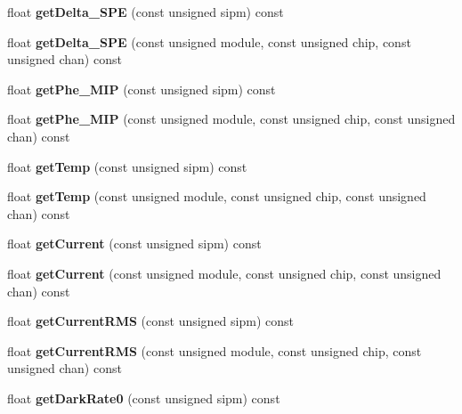 \begin{DoxyCompactItemize}
\item 
float {\bfseries get\-Delta\-\_\-\-S\-P\-E} (const unsigned sipm) const \label{classCALICE_1_1SiPmPropertiesProcessor_abfdc56fb42ad7b8bf6e03214bb0b8469}

\item 
float {\bfseries get\-Delta\-\_\-\-S\-P\-E} (const unsigned module, const unsigned chip, const unsigned chan) const \label{classCALICE_1_1SiPmPropertiesProcessor_a021746c535440dd242e6b20905de0a1c}

\item 
float {\bfseries get\-Phe\-\_\-\-M\-I\-P} (const unsigned sipm) const \label{classCALICE_1_1SiPmPropertiesProcessor_a64772de1f9b49b8ed47fda7d6cc57333}

\item 
float {\bfseries get\-Phe\-\_\-\-M\-I\-P} (const unsigned module, const unsigned chip, const unsigned chan) const \label{classCALICE_1_1SiPmPropertiesProcessor_a9db41320e1716882cb33723aa551e836}

\item 
float {\bfseries get\-Temp} (const unsigned sipm) const \label{classCALICE_1_1SiPmPropertiesProcessor_a91d70d19cf8b218cc0517f334cc07854}

\item 
float {\bfseries get\-Temp} (const unsigned module, const unsigned chip, const unsigned chan) const \label{classCALICE_1_1SiPmPropertiesProcessor_ad13cd4fa8844c174a70d053ecff3cad1}

\item 
float {\bfseries get\-Current} (const unsigned sipm) const \label{classCALICE_1_1SiPmPropertiesProcessor_a788712be73ed68655e86fd3daed1ec45}

\item 
float {\bfseries get\-Current} (const unsigned module, const unsigned chip, const unsigned chan) const \label{classCALICE_1_1SiPmPropertiesProcessor_ae87066c5331155c15148adc1098afe31}

\item 
float {\bfseries get\-Current\-R\-M\-S} (const unsigned sipm) const \label{classCALICE_1_1SiPmPropertiesProcessor_adcf12d0d6c7817e2f6a606788149695e}

\item 
float {\bfseries get\-Current\-R\-M\-S} (const unsigned module, const unsigned chip, const unsigned chan) const \label{classCALICE_1_1SiPmPropertiesProcessor_ac5701f48c8621fe51e9456f54b7586dc}

\item 
float {\bfseries get\-Dark\-Rate0} (const unsigned sipm) const \label{classCALICE_1_1SiPmPropertiesProcessor_a83b705eca630fe53acc7e9ccd46f046a}


\end{DoxyCompactItemize}
